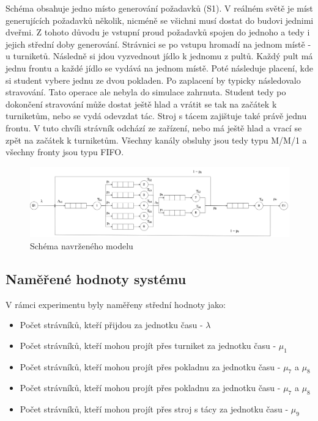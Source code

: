 \documentclass{article}
\begin{document}
Schéma obsahuje jedno místo generování požadavků (S1).
 V reálném světě je míst generujících požadavků několik, nicméně se všichni musí dostat do budovi jednimi dveřmi.
Z tohoto důvodu je vstupní proud požadavků spojen do jednoho a tedy i jejich střední doby generování.
Strávnici se po vstupu hromadí na jednom místě - u turniketů.
Následně si jdou vyzvednout jídlo k jednomu z pultů. 
Každý pult má jednu frontu a každé jídlo se vydává na jednom místě.
Poté následuje placení, kde si student vybere jednu ze dvou pokladen. 
Po zaplacení by typicky následovalo stravování. 
Tato operace ale nebyla do simulace zahrnuta.
Student tedy po dokončení stravování může dostat ještě hlad a vrátit se tak na začátek k turniketům, nebo se vydá odevzdat tác.
Stroj s tácem zajištuje také právě jednu frontu.
V tuto chvíli strávník odchází ze zařízení, nebo má ještě hlad a vrací se zpět na začátek k turniketům.
Všechny kanály obsluhy jsou tedy typu M/M/1 a všechny fronty jsou typu FIFO.

	\begin{figure} [ht!]
		\centering
		\includegraphics[width=1\linewidth]{menza_moje}
		\caption[Schéma navrženého modelut]{Schéma navrženého modelu}
		\label{fig:schema_menza}
	\end{figure}

\subsection{Naměřené hodnoty systému}

V rámci experimentu byly naměřeny střední hodnoty jako:

\begin{itemize}  
\item Počet strávníků, kteří přijdou za jednotku času - $\lambda$
\item Počet strávníků, kteří mohou projít přes turniket za jednotku času - $\mu_1$
\item Počet strávníků, kteří mohou projít přes pokladnu za jednotku času - $\mu_7$ a $\mu_8$
\item Počet strávníků, kteří mohou projít přes pokladnu za jednotku času - $\mu_7$ a $\mu_8$
\item Počet strávníků, kteří mohou projít přes stroj s tácy za jednotku času - $\mu_9$
\end{itemize}
\end{document}

